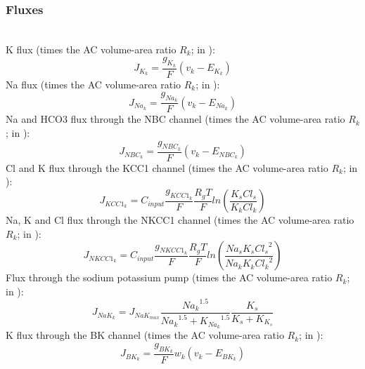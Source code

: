\subsubsection*{Fluxes}\label{sec:EqNeAcflux}~\\ 
%
\gls{K} flux (times the AC volume-area ratio $R_k$; in \uMmps): 
\begin{equation} \label{eq:J_K}
J_{K_k}=\frac{g_{K_{k}}}{F}(v_k - E_{K_k})
\end{equation}
%
\gls{Na} flux (times the AC volume-area ratio $R_k$; in \uMmps):
\begin{equation} \label{eq:J_Na}
J_{Na_k}=\frac{g_{Na_{k}}}{F}(v_k - E_{Na_k})
\end{equation}
%
\gls{Na} and \gls{HCO3} flux through the NBC channel  (times the AC volume-area ratio $R_k$; in \uMmps): 
\begin{equation} \label{eq:J_NBC}
J_{NBC_k}=\frac{g_{NBC_k}}{F}\left(  v_k -E_{NBC_k}  \right)
\end{equation}
%
\gls{Cl} and \gls{K} flux through the KCC1 channel  (times the AC volume-area ratio $R_k$; in \uMmps): 
\begin{equation} \label{eq:J_KCC1}
J_{KCC1_k}=C_{input}\frac{g_{KCC1_k}}{F}\frac{R_gT}{F}ln \left(\frac{K_s Cl_s }{K_k Cl_k}\right)
\end{equation}
%
\gls{Na}, \gls{K} and \gls{Cl} flux through the NKCC1 channel   (times the AC volume-area ratio $R_k$; in \uMmps): 
\begin{equation} \label{eq:J_NKCC1}
J_{NKCC1_k}=C_{input}\frac{g_{NKCC1_k}}{F}\frac{R_gT}{F}ln \left(\frac{Na_s K_s {Cl_s}^2}{Na_k K_k {Cl_k}^2}\right)
\end{equation}
%
Flux through the sodium potassium pump   (times the \gls{AC} volume-area ratio $R_k$; in \uMmps): 
\begin{equation} \label{eq:J_NaK_s}
J_{NaK_{k}}=J_{NaK_{max}}\frac{{Na_k}^{1.5}}{{Na_k}^{1.5}+{K_{Na_k}}^{1.5}}\frac{K_s}{K_s+K_{K_s}}
\end{equation}
%
\gls{K} flux through the BK channel  (times the \gls{AC} volume-area ratio $R_k$; in \uMmps): 
\begin{equation} \label{eq:J_BK}
J_{BK_k}=\frac{g_{BK_k}}{F}w_k\left( v_k-E_{BK_k} \right)
\end{equation}
%
%
%
